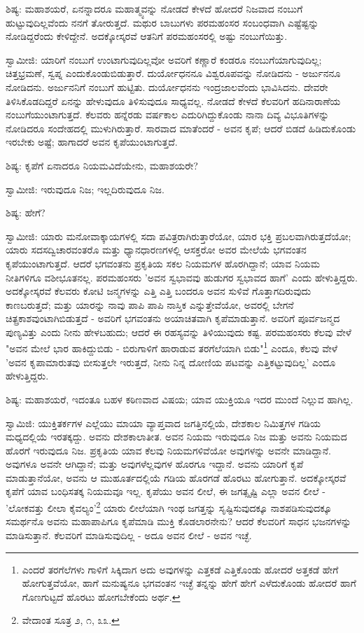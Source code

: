ಶಿಷ್ಯ: ಮಹಾಶಯರೆ, ಏನನ್ನಾದರೂ ಮಹಾತ್ಮ್ಯವನ್ನು ನೋಡದೆ ಕೇಳದೆ ಹೋದರೆ ನಿಜವಾದ ನಂಬುಗೆ ಹುಟ್ಟುವುದಿಲ್ಲವೆಂದು ನನಗೆ ತೋರುತ್ತದೆ. ಮಥುರ ಬಾಬುಗಳು ಪರಮಹಂಸರ ಸಂಬಂಧವಾಗಿ ಎಷ್ಟೆಷ್ಟನ್ನು ನೋಡಿದ್ದರೆಂದು ಕೇಳಿದ್ದೇನೆ. ಅದಕ್ಕೋಸ್ಕರವೆ ಆತನಿಗೆ ಪರಮಹಂಸರಲ್ಲಿ ಅಷ್ಟು ನಂಬುಗೆಯಿತ್ತು.

ಸ್ವಾಮೀಜಿ: ಯಾರಿಗೆ ನಂಬುಗೆ ಉಂಟಾಗುವುದಿಲ್ಲವೋ ಅವರಿಗೆ ಕಣ್ಣಾರೆ ಕಂಡರೂ ನಂಬುಗೆಯಾಗುವುದಿಲ್ಲ; ಚಿತ್ತಭ್ರಮಣೆ, ಸ್ವಪ್ನ ಎಂದುಕೊಂಡುಬಿಡುತ್ತಾರೆ. ದುರ್ಯೋಧನನೂ ವಿಶ್ವರೂಪವನ್ನು ನೋಡಿದನು - ಅರ್ಜುನನೂ ನೋಡಿದನು. ಅರ್ಜುನನಿಗೆ ನಂಬುಗೆ ಹುಟ್ಟಿತು. ದುರ್ಯೋಧನನು ಇಂದ್ರಜಾಲವೆಂದು ಭಾವಿಸಿದನು. ದೇವರೇ ತಿಳಿಸಿಕೊಡದಿದ್ದರೆ ಏನನ್ನು ಹೇಳುವುದೂ ತಿಳಿಸುವುದೂ ಸಾಧ್ಯವಲ್ಲ. ನೋಡದೆ ಕೇಳದೆ ಕೆಲವರಿಗೆ ಹದಿನಾರಾಣೆಯ ನಂಬುಗೆಯುಂಟಾಗುತ್ತದೆ. ಕೆಲವರು ಹನ್ನೆರಡು ವರ್ಷಕಾಲ ಎದುರಿಗಿದ್ದುಕೊಂಡು ನಾನಾ ದಿವ್ಯ ವಿಭೂತಿಗಳನ್ನು ನೋಡಿದರೂ ಸಂದೇಹದಲ್ಲಿ ಮುಳುಗಿರುತ್ತಾರೆ. ಸಾರವಾದ ಮಾತೆಂದರೆ - ಅವನ ಕೃಪೆ; ಆದರೆ ಬಿಡದೆ ಹಿಡಿದುಕೊಂಡು ಇರಬೇಕು ಅಷ್ಟೆ; ಹಾಗಾದರೆ ಅವನ ಕೃಪೆಯುಂಟಾಗುತ್ತದೆ.

ಶಿಷ್ಯ: ಕೃಪೆಗೆ ಏನಾದರೂ ನಿಯಮವಿದೆಯೇನು, ಮಹಾಶಯರೇ?

ಸ್ವಾಮೀಜಿ: ಇರುವುದೂ ನಿಜ; ಇಲ್ಲದಿರುವುದೂ ನಿಜ.

ಶಿಷ್ಯ: ಹೇಗೆ?

ಸ್ವಾಮೀಜಿ: ಯಾರು ಮನೋವಾಕ್ಕಾಯಗಳಲ್ಲಿ ಸದಾ ಪವಿತ್ರರಾಗಿರುತ್ತಾರೆಯೋ, ಯಾರ ಭಕ್ತಿ ಪ್ರಬಲವಾಗಿರುತ್ತದೆಯೋ; ಯಾರು ಸದಸದ್ವಿಚಾರವಂತರೊ ಮತ್ತು ಧ್ಯಾನಧಾರಣಗಳಲ್ಲಿ ಆಸಕ್ತರೋ ಅವರ ಮೇಲೆಯೆ ಭಗವಂತನ ಕೃಪೆಯುಂಟಾಗುತ್ತದೆ. ಆದರೆ ಭಗವಂತನು ಪ್ರಕೃತಿಯ ಸಕಲ ನಿಯಮಗಳ ಹೊರಗಿದ್ದಾನೆ; ಯಾವ ನಿಯಮ ನೀತಿಗಳಿಗೂ ವಶೀಭೂತನಲ್ಲ. ಪರಮಹಂಸರು 'ಅವನ ಸ್ವಭಾವವು ಹುಡುಗರ ಸ್ವಭಾವದ ಹಾಗೆ' ಎಂದು ಹೇಳುತ್ತಿದ್ದರು. ಅದಕ್ಕೋಸ್ಕರವೆ ಕೆಲವರು ಕೋಟಿ ಜನ್ಮಗಳನ್ನು ಎತ್ತಿ ಎತ್ತಿ ಬಂದರೂ ಅವನ ಸುಳಿವೆ ಗೊತ್ತಾಗದಿರುವುದು ಕಾಣಬರುತ್ತದೆ; ಮತ್ತು ಯಾರನ್ನು ನಾವು ಪಾಪಿ ಪಾಪಿ ನಾಸ್ತಿಕ ಎನ್ನುತ್ತೇವೆಯೋ, ಅವರಲ್ಲಿ ಬೇಗನೆ ಚಿತ್ಪ್ರಕಾಶವುಂಟಾಗಿಬಿಡುತ್ತದೆ - ಅವರಿಗೆ ಭಗವಂತನು ಅಯಾಚಿತವಾಗಿ ಕೃಪೆಮಾಡುತ್ತಾನೆ. ಅವರಿಗೆ ಪೂರ್ವಜನ್ಮದ ಪುಣ್ಯವಿತ್ತು ಎಂದು ನೀನು ಹೇಳಬಹುದು; ಆದರೆ ಈ ರಹಸ್ಯವನ್ನು ತಿಳಿಯುವುದು ಕಷ್ಟ. ಪರಮಹಂಸರು ಕೆಲವು ವೇಳೆ "ಅವನ ಮೇಲೆ ಭಾರ ಹಾಕಿದ್ದುಬಿಡು - ಬಿರುಗಾಳಿಗೆ ಹಾರಾಡುವ ತರಗೆಲೆಯಾಗಿ ಬಿಡು"\footnote{ಎಂದರೆ ತರಗೆಲೆಗಳು ಗಾಳಿಗೆ ಸಿಕ್ಕಿದಾಗ ಅದು ಅವುಗಳನ್ನು ಎತ್ತಕಡೆ ಎತ್ತಿಕೊಂಡು ಹೋದರೆ ಅತ್ತಕಡೆ ಹೇಗೆ ಹೋಗುತ್ತವೆಯೋ, ಹಾಗೆ ಮನುಷ್ಯನೂ ಭಗವಂತನ ಇಚ್ಛೆ ತನ್ನನ್ನು ಹೇಗೆ ಹೇಗೆ ಎಳೆದುಕೊಂಡು ಹೋದರೆ ಹಾಗೆ ಗೊಣಗುಟ್ಟದೆ ಹೊರಟು ಹೋಗಬೇಕೆಂದು ಅರ್ಥ.} ಎಂದೂ, ಕೆಲವು ವೇಳೆ 'ಅವನ ಕೃಪಾಮಾರುತವು ಬೀಸುತ್ತಲೇ ಇರುತ್ತದೆ, ನೀನು ನಿನ್ನ ದೋಣಿಯ ಪಟವನ್ನು ಎತ್ತಿಕಟ್ಟುವುದಿಲ್ಲ' ಎಂದೂ ಹೇಳುತ್ತಿದ್ದರು.

ಶಿಷ್ಯ: ಮಹಾಶಯರೆ, ಇದಂತೂ ಬಹಳ ಕಠಿಣವಾದ ವಿಷಯ; ಯಾವ ಯುಕ್ತಿಯೂ ಇದರ ಮುಂದೆ ನಿಲ್ಲುವ ಹಾಗಿಲ್ಲ.

ಸ್ವಾಮಿಜಿ: ಯುಕ್ತಿತರ್ಕಗಳ ಎಲ್ಲೆಯು ಮಾಯಾ ವ್ಯಾಪ್ತವಾದ ಜಗತ್ತಿನಲ್ಲಿಯೆ, ದೇಶಕಾಲ ನಿಮಿತ್ತಗಳ ಗಡಿಯ ಮಧ್ಯದಲ್ಲಿಯೆ ಇರತಕ್ಕದ್ದು. ಅವನು ದೇಶಕಾಲಾತೀತ. ಅವನ ನಿಯಮ ಇರುವುದೂ ನಿಜ ಮತ್ತು ಅವನು ನಿಯಮದ ಹೊರಗೆ ಇರುವುದೂ ನಿಜ. ಪ್ರಕೃತಿಯ ಯಾವ ಕೆಲವು ನಿಯಮಗಳಿವೆಯೋ ಅವುಗಳನ್ನು ಅವನೇ ಮಾಡಿದ್ದಾನೆ. ಅವುಗಳೂ ಅವನೇ ಆಗಿದ್ದಾನೆ; ಮತ್ತು ಅವುಗಳೆಲ್ಲವುಗಳ ಹೊರಗೂ ಇದ್ದಾನೆ. ಅವನು ಯಾರಿಗೆ ಕೃಪೆ ಮಾಡುತ್ತಾನೆಯೋ, ಅವನು ಆ ಮುಹೂರ್ತದಲ್ಲಿಯೆ ಗಡಿಯ ಹೊರಗಡೆ ಹೊರಟು ಹೋಗುತ್ತಾನೆ. ಅದಕ್ಕೋಸ್ಕರವೆ ಕೃಪೆಗೆ ಯಾವ ಬಂಧಿಸತಕ್ಕ ನಿಯಮವೂ ಇಲ್ಲ. ಕೃಪೆಯು ಅವನ ಲೀಲೆ, ಈ ಜಗತ್ಸೃಷ್ಟಿ ಎಲ್ಲಾ ಅವನ ಲೀಲೆ - 'ಲೋಕವತ್ತು ಲೀಲಾ ಕೈವಲ್ಯಂ'\footnote{ವೇದಾಂತ ಸೂತ್ರ ೨, ೧, ೩೩.} ಯಾರು ಲೀಲೆಯಾಗಿ ಇಂಥ ಜಗತ್ತನ್ನು ಸೃಷ್ಟಿಸುವುದಕ್ಕೂ ನಾಶಪಡಿಸುವುದಕ್ಕೂ ಸಮರ್ಥನೊ ಅವನು ಮಹಾಪಾಪಿಗೂ ಕೃಪೆಮಾಡಿ ಮುಕ್ತಿ ಕೊಡಲಾರನೇನು? ಆದರೆ ಕೆಲವರಿಗೆ ಸಾಧನ ಭಜನಗಳನ್ನು ಮಾಡಿಸುತ್ತಾನೆ. ಕೆಲವರಿಗೆ ಮಾಡಿಸುವುದಿಲ್ಲ - ಅದೂ ಅವನ ಲೀಲೆ - ಅವನ ಇಚ್ಛೆ.

